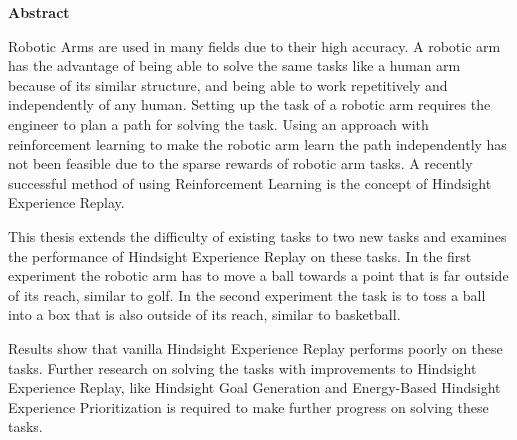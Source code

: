 

\clearemptydoublepage
{}
{}





\vspace*{2cm}
\begin{center}
{\Large \bf Abstract}
\end{center}
\vspace{1cm}


Robotic Arms are used in many fields due to their high accuracy. A robotic arm has the advantage of being able to solve the same tasks like a human arm because of its similar structure, and being able to work repetitively and independently of any human. Setting up the task of a robotic arm requires the engineer to plan a path for solving the task. Using an approach with reinforcement learning to make the robotic arm learn the path independently has not been feasible due to the sparse rewards of robotic arm tasks. A recently successful method of using Reinforcement Learning is the concept of Hindsight Experience Replay. 

\vspace{0.5cm}

This thesis extends the difficulty of existing tasks to two new tasks and examines the performance of Hindsight Experience Replay on these tasks. 
In the first experiment the robotic arm has to move a ball towards a point that is far outside of its reach, similar to golf.
In the second experiment the task is to toss a ball into a box that is also outside of its reach, similar to basketball.

\vspace{0.5cm}

Results show that vanilla Hindsight Experience Replay performs poorly on these tasks. Further research on solving the tasks with improvements to Hindsight Experience Replay, like Hindsight Goal Generation and Energy-Based Hindsight Experience Prioritization is required to make further progress on solving these tasks.


